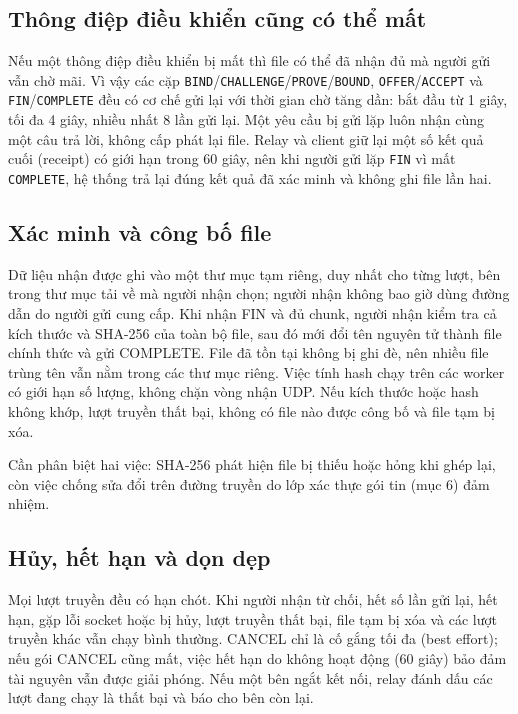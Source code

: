 \subsection{Thông điệp điều khiển cũng có thể mất}
Nếu một thông điệp điều khiển bị mất thì file có thể đã nhận đủ mà người gửi vẫn chờ mãi. Vì vậy các cặp \texttt{BIND}/\texttt{CHALLENGE}/\texttt{PROVE}/\texttt{BOUND}, \texttt{OFFER}/\texttt{ACCEPT} và \texttt{FIN}/\texttt{COMPLETE} đều có cơ chế gửi lại với thời gian chờ tăng dần: bắt đầu từ 1 giây, tối đa 4 giây, nhiều nhất 8 lần gửi lại. Một yêu cầu bị gửi lặp luôn nhận cùng một câu trả lời, không cấp phát lại file. Relay và client giữ lại một số kết quả cuối (receipt) có giới hạn trong 60 giây, nên khi người gửi lặp \texttt{FIN} vì mất \texttt{COMPLETE}, hệ thống trả lại đúng kết quả đã xác minh và không ghi file lần hai.

\subsection{Xác minh và công bố file}
Dữ liệu nhận được ghi vào một thư mục tạm riêng, duy nhất cho từng lượt, bên trong thư mục tải về mà người nhận chọn; người nhận không bao giờ dùng đường dẫn do người gửi cung cấp. Khi nhận FIN và đủ chunk, người nhận kiểm tra cả kích thước và SHA-256 của toàn bộ file, sau đó mới đổi tên nguyên tử thành file chính thức và gửi COMPLETE. File đã tồn tại không bị ghi đè, nên nhiều file trùng tên vẫn nằm trong các thư mục riêng. Việc tính hash chạy trên các worker có giới hạn số lượng, không chặn vòng nhận UDP. Nếu kích thước hoặc hash không khớp, lượt truyền thất bại, không có file nào được công bố và file tạm bị xóa.

Cần phân biệt hai việc: SHA-256 phát hiện file bị thiếu hoặc hỏng khi ghép lại, còn việc chống sửa đổi trên đường truyền do lớp xác thực gói tin (mục 6) đảm nhiệm.

\subsection{Hủy, hết hạn và dọn dẹp}
Mọi lượt truyền đều có hạn chót. Khi người nhận từ chối, hết số lần gửi lại, hết hạn, gặp lỗi socket hoặc bị hủy, lượt truyền thất bại, file tạm bị xóa và các lượt truyền khác vẫn chạy bình thường. CANCEL chỉ là cố gắng tối đa (best effort); nếu gói CANCEL cũng mất, việc hết hạn do không hoạt động (60 giây) bảo đảm tài nguyên vẫn được giải phóng. Nếu một bên ngắt kết nối, relay đánh dấu các lượt đang chạy là thất bại và báo cho bên còn lại.

